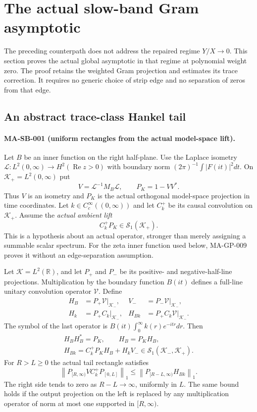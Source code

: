 \section{The actual slow-band Gram asymptotic}
\label{sec:slow-band-gram}

The preceding counterpath does not address the repaired regime
$Y/X\to0$.  This section proves the actual global asymptotic
in that regime at polynomial weight zero.  The proof retains
the weighted Gram projection and estimates its trace correction.
It requires no generic choice of strip edge and no separation
of zeros from that edge.

\subsection{An abstract trace-class Hankel tail}

\paragraph{MA-SB-001 (uniform rectangles from the actual model-space lift).}
Let $B$ be an inner function on the right half-plane.
Use the Laplace isometry
$\mathcal L:L^2(0,\infty)\to H^2(\operatorname{Re}z>0)$
with boundary norm $(2\pi)^{-1}\int|F(it)|^2dt$.
On $\mathcal K_+=L^2(0,\infty)$ put
\[
 V=\mathcal L^{-1}M_B\mathcal L,\qquad
 P_K=1-VV^* .
 \tag{MA-SB.1}
\]
Thus $V$ is an isometry and $P_K$ is the actual orthogonal
model-space projection in time coordinates.
Let $k\in C_c^\infty((0,\infty))$ and let
$C_k^+$ be its causal convolution on $\mathcal K_+$.
Assume the \emph{actual ambient lift}
\[
                         C_k^+P_K\in\mathcal S_1(\mathcal K_+).
 \tag{MA-SB.2}
\]
This is a hypothesis about an actual operator, stronger
than merely assigning a summable scalar spectrum.
For the zeta inner function used below, MA-GP-009 proves it
without an edge-separation assumption.

Let $\mathcal K=L^2(\mathbb R)$, and let $P_+$ and $P_-$
be its positive- and negative-half-line projections.
Multiplication by the boundary function $B(it)$ defines
a full-line unitary convolution operator $\mathcal V$.
Define
\[
 \begin{aligned}
 H_B&=P_+\mathcal V|_{\mathcal K_-},&
 V_-&=P_-\mathcal V|_{\mathcal K_-},\\
 H_k&=P_+C_k|_{\mathcal K_-},&
 H_{Bk}&=P_+C_k\mathcal V|_{\mathcal K_-}.
 \end{aligned}
 \tag{MA-SB.3}
\]
The symbol of the last operator is
$B(it)\int_0^\infty k(r)e^{-itr}dr$.
Then
\[
 \begin{gathered}
 H_BH_B^*=P_K,\qquad H_B=P_KH_B,\\
 H_{Bk}=C_k^+P_KH_B+H_kV_-\in
                  \mathcal S_1(\mathcal K_-,\mathcal K_+).
 \end{gathered}
 \tag{MA-SB.4}
\]
For $R>L\ge0$ the actual tail rectangle satisfies
\[
 \left\|P_{[R,\infty)}VC_k^+P_{[0,L]}\right\|_1
 \le
 \left\|P_{[R-L,\infty)}H_{Bk}\right\|_1.
 \tag{MA-SB.5}
\]
The right side tends to zero as $R-L\to\infty$,
uniformly in $L$.  The same bound holds if the output
projection on the left is replaced by any multiplication
operator of norm at most one supported in $[R,\infty)$.

